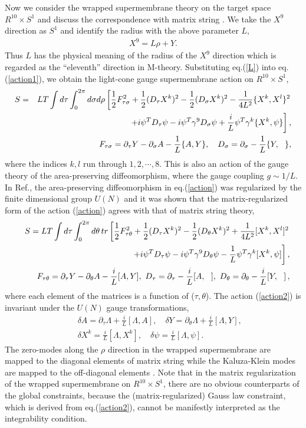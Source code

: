 \documentclass[a4paper,12pt]{article}
\newcommand{\nn}{\nonumber\\}
\newcommand{\ptau}{\partial_\tau}
\newcommand{\pth}{\partial_\theta}
\begin{document}
Now we consider the wrapped supermembrane theory on the target space
$R^{10}\times S^1$ and discuss the correspondence with matrix string
\cite{SY}. We take the $X^9$ direction as $S^1$ and identify the
radius with the above parameter $L$,
\begin{eqnarray}
	X^9=L\rho +Y.\label{L}
\end{eqnarray}
Thus $L$ has the physical meaning of the radius of the $X^9$ direction
which is regarded as the ``eleventh'' direction in M-theory.
Substituting eq.(\ref{L}) into eq.(\ref{action1}), we obtain the
light-cone gauge supermembrane action on
$R^{10}\times S^1$,
\begin{eqnarray}
  S&=&LT\int d\tau \int_0^{2\pi}d\sigma d\rho \left[
	\frac{1}{2}F_{\tau\sigma}^2 +\frac{1}{2}(D_{\tau}X^k)^2
	-\frac{1}{2}(D_{\sigma}X^k)^2 -\frac{1}{4L^2}\{ X^k,X^l\}^2
	\right.\nn
  &&\hspace{20ex} \left.+i\psi^T D_{\tau}\psi -i\psi^T \gamma^9
	D_{\sigma}\psi +\frac{i}{L}\psi^T\gamma^k\{ X^k,\psi\}
	\right], \label{action}\\
  &&F_{\tau\sigma}=\ptau  Y - \partial_{\sigma}A -
	\frac{1}{L}\{A,Y\},\quad
  D_{\sigma}=\partial_{\sigma}-\frac{1}{L}\{Y,~~\},
\end{eqnarray}
where the indices $k,l$ run through $1,2,\cdots,8$.
This is also an action of the gauge theory of the area-preserving
diffeomorphism, where the gauge coupling $g\sim 1/L$.
In Ref.\cite{SY}, the area-preserving diffeomorphism in
eq.(\ref{action}) was regularized by the finite dimensional group
$U(N)$ and it was shown that the matrix-regularized form of the action
(\ref{action}) agrees with that of matrix string theory,
\begin{eqnarray}
  &&S=LT\int d\tau \int_0^{2\pi}d\theta \,tr\left[
	\frac{1}{2}F_{\tau\theta}^2 +\frac{1}{2}(D_{\tau}X^k)^2
	-\frac{1}{2}(D_{\theta}X^k)^2 +\frac{1}{4L^2}[ X^k,X^l]^2
	\right.\nn
  &&\hspace{20ex} \left.+i\psi^T D_{\tau}\psi -i\psi^T \gamma^9
	D_{\theta}\psi -\frac{1}{L}\psi^T\gamma^k[X^k,\psi]
	\right],\label{action2}\\
  &&F_{\tau\theta}=\ptau  Y - \pth A - \frac{i}{L}[A,Y],~
  D_{\tau}=\ptau -\frac{i}{L}[A,~~],~
 D_{\theta}=\pth -\frac{i}{L}[Y,~~]\,,
\end{eqnarray}
where each element of the matrices is a function of ($\tau,\theta$).
The action (\ref{action2}) is invariant under the $U(N)$ gauge
transformations,
\begin{eqnarray}
  &&\delta A=\ptau  \Lambda + \frac{i}{L}[\Lambda,A],\quad
  \delta Y=\pth  \Lambda + \frac{i}{L}[\Lambda,Y],\nn
  &&\delta X^k= \frac{i}{L}[\Lambda,X^k],\quad
  \delta \psi= \frac{i}{L}[\Lambda,\psi].\label{gauge}
\end{eqnarray}
The zero-modes along the $\rho$ direction in the wrapped supermembrane
are mapped to the diagonal elements of matrix string while the
Kaluza-Klein modes are mapped to the off-diagonal elements \cite{SY}.
Note that in the matrix regularization of the wrapped supermembrane on
$R^{10} \times S^1$, there are no obvious counterparts of the global
constraints, because the (matrix-regularized) Gauss law constraint,
which is derived from eq.(\ref{action2}), cannot be manifestly
interpreted as the integrability condition.
\end{document}
